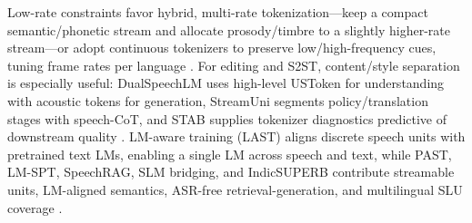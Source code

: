 \documentclass{article}
\begin{document}
Low-rate constraints favor hybrid, multi-rate tokenization---keep a compact semantic/phonetic stream and allocate prosody/timbre to a slightly higher-rate stream---or adopt continuous tokenizers to preserve low/high-frequency cues, tuning frame rates per language \cite{li2025continuousspeechtokenizertext,zhang2025impactframeratesspeechtokenizercasestudy,yang2025almtokenizerlowbitratesemanticrichaudioc,yang2025diffsoundstreamefficientspeechtokenizati}. For editing and S2ST, content/style separation is especially useful: DualSpeechLM uses high-level USToken for understanding with acoustic tokens for generation, StreamUni segments policy/translation stages with speech-CoT, and STAB supplies tokenizer diagnostics predictive of downstream quality \cite{wang2025dualspeechlmtowardsunifiedspeechundersta,guo2025streamuniachievingstreamingspeechtransla,vashishth2024stabspeechtokenizerassessmentbenchmark}. LM-aware training (LAST) aligns discrete speech units with pretrained text LMs, enabling a single LM across speech and text, while PAST, LM-SPT, SpeechRAG, SLM bridging, and IndicSUPERB contribute streamable units, LM-aligned semantics, ASR-free retrieval-generation, and multilingual SLU coverage \cite{turetzky2024lastlanguagemodelawarespeechtokenization,har-tuv2025pastphoneticacousticspeechtokenizer,jo2025lmsptalignedsemanticdistillationspeechto,min2025speechretrievalaugmentedgenerationwithou,wang2023slmbridgethingapbetweenspeechtextfoundat,entry2025indicsuperbspeechprocessinguniversalperf}. 
\end{document}
